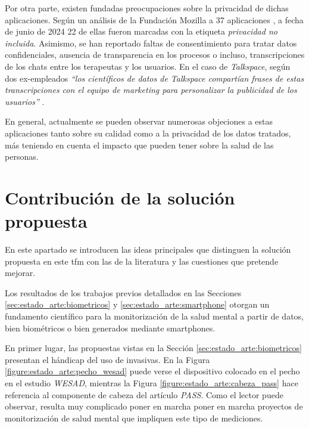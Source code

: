         Por otra parte, existen fundadas preocupaciones sobre la privacidad de dichas aplicaciones. Según un análisis de la Fundación Mozilla a 37 aplicaciones \cite{mozilla_foundation_privacidad_nodate}, a fecha de junio de 2024 22 de ellas fueron marcadas con la etiqueta \textit{privacidad no incluida}. Asimismo, se han reportado faltas de consentimiento para tratar datos confidenciales, ausencia de transparencia en los procesos o incluso, transcripciones de los chats entre los terapeutas y los usuarios. En el caso de \textit{Talkspace}, según dos ex-empleados \textit{``los científicos de datos de Talkspace compartían frases de estas transcripciones con el equipo de marketing para personalizar la publicidad de los usuarios''} \cite{bejerano_lado_2023}.
        
        En general, actualmente se pueden observar numerosas objeciones a estas aplicaciones tanto sobre su calidad como a la privacidad de los datos tratados, más teniendo en cuenta el impacto que pueden tener sobre la salud de las personas.

\section{Contribución de la solución propuesta}

    En este apartado se introducen las ideas principales que distinguen la solución propuesta en este \gls{tfm} con las de la literatura y las cuestiones que pretende mejorar.

    Los resultados de los trabajos previos detallados en las Secciones 
    \ref{sec:estado_arte:biometricos} y \ref{sec:estado_arte:smartphone} otorgan un fundamento científico para la monitorización de la salud mental a partir de datos, bien biométricos o bien generados mediante \glspl{smartphone}. 

    En primer lugar, las propuestas vistas en la Sección \ref{sec:estado_arte:biometricos} presentan el hándicap del uso de \glspl{invasiva}. En la Figura \ref{figure:estado_arte:pecho_wesad} puede verse el dispositivo colocado en el pecho en el estudio \textit{WESAD}, mientras la Figura  \ref{figure:estado_arte:cabeza_pass} hace referencia al componente de cabeza del artículo \textit{PASS}. Como el lector puede observar, resulta muy complicado poner en marcha poner en marcha proyectos de monitorización de salud mental que impliquen este tipo de mediciones.

